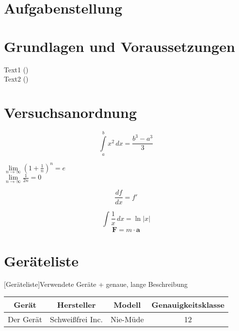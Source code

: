 \documentclass[11pt]{scrartcl}
\begin{document}
%

\clearpage
\tableofcontents
\newpage

\section{Aufgabenstellung}
\label{sec:aufgabenstellung}

\section{Grundlagen und Voraussetzungen}
\label{sec:grundlagen_voraussetzungen}

Text1 (\cite[1000]{ref:dem1}) \\
Text2 (\cite[Kapitel 74]{ref:knoll})


\section{Versuchsanordnung}
\label{sec:versuchsanordnung}

\begin{equation}
\label{eq:grenzen-oben-unten}
    \int \limits_{a}^{b} x^2 \, dx =\frac{b^3-a^3}{3}  %
\end{equation}

\(\lim \limits_{n \to \infty} \left( 1 + \frac{1}{n} \right) ^{n} = e\)  \\ %
$\lim \limits_{n \to \infty} \frac{1}{2n} = 0$  %

\begin{displaymath}
    \frac{df}{dx} = f'
\end{displaymath}

\[ \int \frac{1}{x} \, dx = \ln|x| \]  %
$$ \textbf{F} = m \cdot \textbf{a} $$  %

\section{Geräteliste}
\label{sec:geraeteliste}

\begin{center}
[Geräteliste]{Verwendete Geräte + genaue, lange Beschreibung}  %
\label{tab:geraeteliste}
    \begin{tabular}{|c|c|c|c|} \hline
        Gerät & Hersteller & Modell & Genauigkeitsklasse \\ \hline
        Der Gerät & Schweißfrei Inc. & Nie-Müde & 12 \\ \hline
    \end{tabular}
\end{center}
\end{document}
